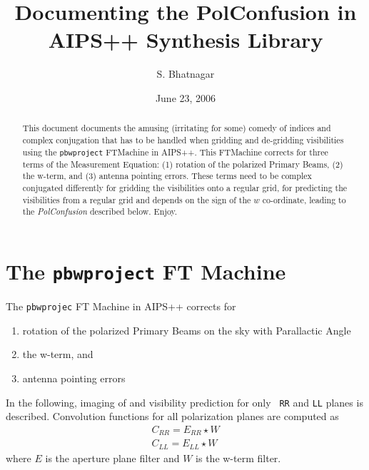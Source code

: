 \documentclass[11pt,epsf]{article}
\begin{document}
\title{Documenting the PolConfusion in AIPS++ Synthesis Library}
\author{S. Bhatnagar}
\date{June 23, 2006}
\maketitle

\normalsize

\begin{abstract}
  This document documents the amusing (irritating for some) comedy of
  indices and complex conjugation that has to be handled when gridding
  and de-gridding visibilities using the {\tt pbwproject} FTMachine in
  AIPS++.  This FTMachine corrects for three terms of the Measurement
  Equation: (1) rotation of the polarized Primary Beams, (2) the
  w-term, and (3) antenna pointing errors.  These terms need to be
  complex conjugated differently for gridding the visibilities onto a
  regular grid, for predicting the visibilities from a regular grid
  and depends on the sign of the $w$ co-ordinate, leading to the
  {\it PolConfusion} described below.  Enjoy.
\end{abstract}

\section{The {\tt pbwproject} FT Machine}

The {\tt pbwprojec} FT Machine in AIPS++ corrects for 
\begin{enumerate}
\item rotation of the polarized Primary Beams on the sky with
  Parallactic Angle
\item the w-term, and
\item antenna pointing errors
\end{enumerate}

In the following, imaging of and visibility prediction for only {\tt
  RR} and {\tt LL} planes is described.  Convolution functions for all
polarization planes are computed as
\begin{eqnarray}
C_{RR} = E_{RR} \star W \nonumber\\
C_{LL} = E_{LL} \star W
\end{eqnarray}
where $E$ is the aperture plane filter and $W$ is the w-term filter.
\end{document}

